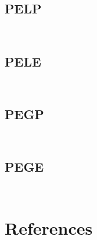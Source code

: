 \documentclass[a4paper,notitlepage]{article}
\newcommand{\sourcecode}[3]{%
\inputminted[linenos=true,tabsize=4,fontsize=\small,frame=lines,framesep=2mm]{c}{#1/#2}
\inputminted[linenos=true,tabsize=4,fontsize=\small,frame=lines,framesep=2mm]{c}{#1/#3}
}
\begin{document}
\subsection{PELP}
\sourcecode{../Algorithms/PredEvalLocalPeriodic}{pelp.h}{pelp.c}

\subsection{PELE}
\sourcecode{../Algorithms/PredEvalLocalEvent}{pele.h}{pele.c}

\subsection{PEGP}
\sourcecode{../Algorithms/PredEvalGlobalPeriodic}{pegp.h}{pegp.c}

\subsection{PEGE}
\sourcecode{../Algorithms/PredEvalGlobalEvent}{pege.h}{pege.c}


\newpage


\section{References}
\renewcommand{\refname}{\vspace{-1cm}}


\end{document}

